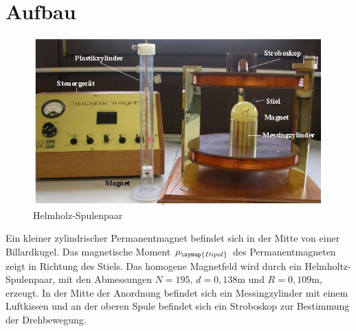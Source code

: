 \section{Aufbau \cite{sample}}

\begin{figure}
  \centering
  \includegraphics[width=\textwidth]{Text/Aufbau.jpg}
  \caption{Helmholz-Spulenpaar \cite[2]{sample}}
  \label{fig:aufbau}
\end{figure}

Ein kleiner zylindrischer Permanentmagnet befindet sich in der Mitte von einer Billardkugel.
Das magnetische Moment $\mu_{\symup{Dipol}}$ des Permanentmagneten zeigt in Richtung des Stiels.
Das homogene Magnetfeld wird durch ein Helmholtz-Spulenpaar,
mit den Abmessungen $N = 195$, $d = 0,138 \mathrm{m}$ und $R = 0,109 \mathrm{m}$, erzeugt.
In der Mitte der Anordnung befindet sich ein Messingzylinder mit einem Luftkissen
und an der oberen Spule befindet sich ein Stroboskop zur Bestimmung der Drehbewegung.
